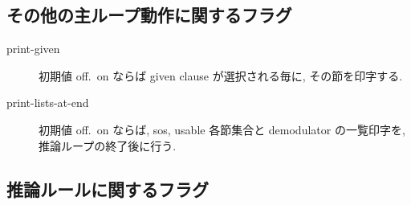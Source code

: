 \subsection{その他の主ループ動作に関するフラグ}
\begin{description}
\item[print-given] 初期値 off.\ on ならば given clause
  が選択される毎に, その節を印字する.
\item[print-lists-at-end] 初期値 off.\ on ならば,
  sos, usable 各節集合と demodulator の一覧印字を,
  推論ループの終了後に行う.
\end{description}

\subsection{推論ルールに関するフラグ}
\label{sec:inf-flags}

